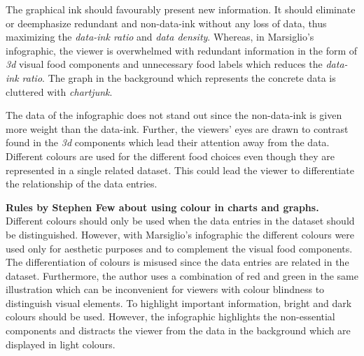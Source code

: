 The graphical ink should favourably present new information. It should eliminate
or deemphasize redundant and non-data-ink without any loss of data, thus
maximizing the \textit{data-ink ratio} and \textit{data density}. Whereas, in
Marsiglio's infographic, the viewer is overwhelmed with redundant information in
the form of \textit{3d} visual food components and unnecessary food labels which
reduces the \textit{data-ink ratio}. The graph in the background which
represents the concrete data is cluttered with \textit{chartjunk}.

The data of the infographic does not stand out since the non-data-ink is given
more weight than the data-ink. Further, the viewers' eyes are drawn to contrast
found in the \textit{3d} components which lead their attention away from the
data. Different colours are used for the different food choices even though they
are represented in a single related dataset. This could lead the viewer to
differentiate the relationship of the data entries.

\textbf{Rules by Stephen Few about using colour in charts and
graphs.}~\cite{Stephen2004} Different colours should only be used when the data
entries in the dataset should be distinguished. However, with Marsiglio's
infographic the different colours were used only for aesthetic purposes and to
complement the visual food components. The differentiation of colours is misused
since the data entries are related in the dataset. Furthermore, the author uses
a combination of red and green in the same illustration which can be
inconvenient for viewers with colour blindness to distinguish visual elements.
To highlight important information, bright and dark colours should be used.
However, the infographic highlights the non-essential components and distracts
the viewer from the data in the background which are displayed in light colours.
